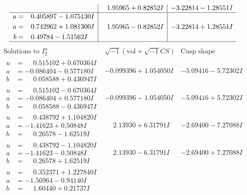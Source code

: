 \documentclass[1p]{elsarticle_modified}
\theoremstyle{definition}
\newcommand{\I}{\sqrt{-1}}
\begin{document}
$$\begin{array}{c|c|c}
 & \phantom{-}1.95965 + 0.82852 I & -3.22814 - 1.28551 I \\ \hline\begin{aligned}
u &= \phantom{-}0.405897 - 1.075130 I \\
a &= \phantom{-}0.742962 + 1.081300 I \\
b &= \phantom{-}0.49784 - 1.51562 I\end{aligned}
 & \phantom{-}1.95965 - 0.82852 I & -3.22814 + 1.28551 I\\
 \hline 
 \end{array}$$\newpage$$\begin{array}{c|c|c}  
\text{Solutions to }I^u_{2}& \I (\text{vol} + \sqrt{-1}CS) & \text{Cusp shape}\\
 \hline 
\begin{aligned}
u &= \phantom{-}0.515102 + 0.670364 I \\
a &= -0.086404 - 0.577180 I \\
b &= \phantom{-}0.058588 + 0.436947 I\end{aligned}
 & -0.099396 + 1.054050 I & -5.09416 - 5.72302 I \\ \hline\begin{aligned}
u &= \phantom{-}0.515102 - 0.670364 I \\
a &= -0.086404 + 0.577180 I \\
b &= \phantom{-}0.058588 - 0.436947 I\end{aligned}
 & -0.099396 - 1.054050 I & -5.09416 + 5.72302 I \\ \hline\begin{aligned}
u &= \phantom{-}0.438792 + 1.104820 I \\
a &= -1.41623 + 0.50848 I \\
b &= \phantom{-}0.26578 - 1.62519 I\end{aligned}
 & \phantom{-}2.13930 + 6.31791 I & -2.69400 - 7.27088 I \\ \hline\begin{aligned}
u &= \phantom{-}0.438792 - 1.104820 I \\
a &= -1.41623 - 0.50848 I \\
b &= \phantom{-}0.26578 + 1.62519 I\end{aligned}
 & \phantom{-}2.13930 - 6.31791 I & -2.69400 + 7.27088 I \\ \hline\begin{aligned}
u &= \phantom{-}0.352371 + 1.227840 I \\
a &= -1.56964 - 0.94140 I \\
b &= \phantom{-}1.60440 + 0.21737 I\end{aligned}

\end{array}$$
\end{document}
